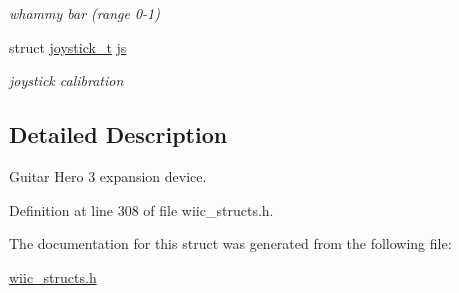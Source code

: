 \begin{DoxyCompactItemize}
\begin{DoxyCompactList}\small\item\em whammy bar (range 0-\/1) \end{DoxyCompactList}\item 
\hypertarget{structguitar__hero__3__t_ad35940d97c2fedc7776efb225742f651}{struct \hyperlink{structjoystick__t}{joystick\-\_\-t} \hyperlink{structguitar__hero__3__t_ad35940d97c2fedc7776efb225742f651}{js}}\label{structguitar__hero__3__t_ad35940d97c2fedc7776efb225742f651}

\begin{DoxyCompactList}\small\item\em joystick calibration \end{DoxyCompactList}\end{DoxyCompactItemize}


\subsection{\-Detailed \-Description}
\-Guitar \-Hero 3 expansion device. 

\-Definition at line 308 of file wiic\-\_\-structs.\-h.



\-The documentation for this struct was generated from the following file\-:\begin{DoxyCompactItemize}
\item 
\hyperlink{wiic__structs_8h}{wiic\-\_\-structs.\-h}\end{DoxyCompactItemize}
